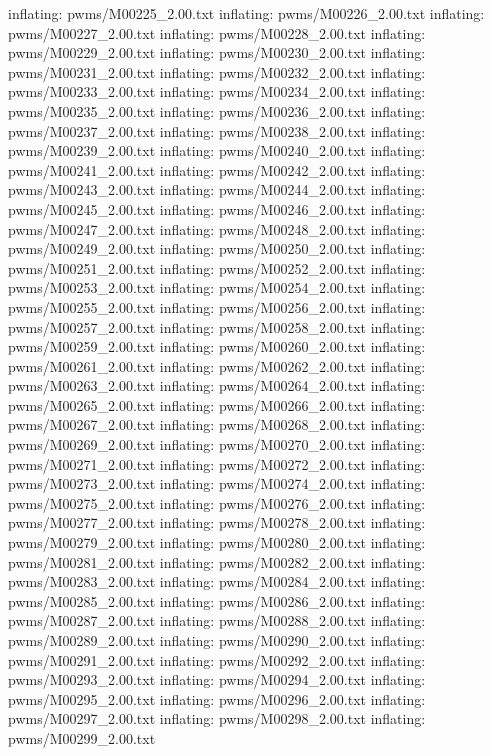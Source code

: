 \documentclass[letterpaper,10pt,english]{sphinxmanual}
\begin{document}
{\begin{sphinxVerbatim}[commandchars=\\\{\}]
  inflating: pwms/M00225\_2.00.txt
  inflating: pwms/M00226\_2.00.txt
  inflating: pwms/M00227\_2.00.txt
  inflating: pwms/M00228\_2.00.txt
  inflating: pwms/M00229\_2.00.txt
  inflating: pwms/M00230\_2.00.txt
  inflating: pwms/M00231\_2.00.txt
  inflating: pwms/M00232\_2.00.txt
  inflating: pwms/M00233\_2.00.txt
  inflating: pwms/M00234\_2.00.txt
  inflating: pwms/M00235\_2.00.txt
  inflating: pwms/M00236\_2.00.txt
  inflating: pwms/M00237\_2.00.txt
  inflating: pwms/M00238\_2.00.txt
  inflating: pwms/M00239\_2.00.txt
  inflating: pwms/M00240\_2.00.txt
  inflating: pwms/M00241\_2.00.txt
  inflating: pwms/M00242\_2.00.txt
  inflating: pwms/M00243\_2.00.txt
  inflating: pwms/M00244\_2.00.txt
  inflating: pwms/M00245\_2.00.txt
  inflating: pwms/M00246\_2.00.txt
  inflating: pwms/M00247\_2.00.txt
  inflating: pwms/M00248\_2.00.txt
  inflating: pwms/M00249\_2.00.txt
  inflating: pwms/M00250\_2.00.txt
  inflating: pwms/M00251\_2.00.txt
  inflating: pwms/M00252\_2.00.txt
  inflating: pwms/M00253\_2.00.txt
  inflating: pwms/M00254\_2.00.txt
  inflating: pwms/M00255\_2.00.txt
  inflating: pwms/M00256\_2.00.txt
  inflating: pwms/M00257\_2.00.txt
  inflating: pwms/M00258\_2.00.txt
  inflating: pwms/M00259\_2.00.txt
  inflating: pwms/M00260\_2.00.txt
  inflating: pwms/M00261\_2.00.txt
  inflating: pwms/M00262\_2.00.txt
  inflating: pwms/M00263\_2.00.txt
  inflating: pwms/M00264\_2.00.txt
  inflating: pwms/M00265\_2.00.txt
  inflating: pwms/M00266\_2.00.txt
  inflating: pwms/M00267\_2.00.txt
  inflating: pwms/M00268\_2.00.txt
  inflating: pwms/M00269\_2.00.txt
  inflating: pwms/M00270\_2.00.txt
  inflating: pwms/M00271\_2.00.txt
  inflating: pwms/M00272\_2.00.txt
  inflating: pwms/M00273\_2.00.txt
  inflating: pwms/M00274\_2.00.txt
  inflating: pwms/M00275\_2.00.txt
  inflating: pwms/M00276\_2.00.txt
  inflating: pwms/M00277\_2.00.txt
  inflating: pwms/M00278\_2.00.txt
  inflating: pwms/M00279\_2.00.txt
  inflating: pwms/M00280\_2.00.txt
  inflating: pwms/M00281\_2.00.txt
  inflating: pwms/M00282\_2.00.txt
  inflating: pwms/M00283\_2.00.txt
  inflating: pwms/M00284\_2.00.txt
  inflating: pwms/M00285\_2.00.txt
  inflating: pwms/M00286\_2.00.txt
  inflating: pwms/M00287\_2.00.txt
  inflating: pwms/M00288\_2.00.txt
  inflating: pwms/M00289\_2.00.txt
  inflating: pwms/M00290\_2.00.txt
  inflating: pwms/M00291\_2.00.txt
  inflating: pwms/M00292\_2.00.txt
  inflating: pwms/M00293\_2.00.txt
  inflating: pwms/M00294\_2.00.txt
  inflating: pwms/M00295\_2.00.txt
  inflating: pwms/M00296\_2.00.txt
  inflating: pwms/M00297\_2.00.txt
  inflating: pwms/M00298\_2.00.txt
  inflating: pwms/M00299\_2.00.txt

\end{sphinxVerbatim}}
\end{document}
